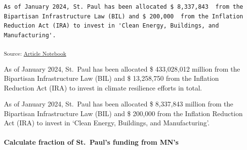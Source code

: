 \documentclass[
  letterpaper,
  DIV=11,
  numbers=noendperiod]{scrartcl}
\let\oldparagraph\paragraph
\renewcommand{\paragraph}[1]{\oldparagraph{#1}\mbox{}}
\begin{document}
\begin{verbatim}
As of January 2024, St. Paul has been allocated $ 8,337,843  from the Bipartisan Infrastructure Law (BIL) and $ 200,000  from the Inflation Reduction Act (IRA) to invest in 'Clean Energy, Buildings, and Manufacturing'.
\end{verbatim}

\textsubscript{Source:
\href{https://beeckcenter.github.io/climate-equity-workforce/index-preview.html}{Article
Notebook}}

As of January 2024, St.~Paul has been allocated \$ 433,028,012 million
from the Bipartisan Infrastructure Law (BIL) and \$ 13,258,750 from the
Inflation Reduction Act (IRA) to invest in climate resilience efforts in
total.

As of January 2024, St.~Paul has been allocated \$ 8,337,843 million
from the Bipartisan Infrastructure Law (BIL) and \$ 200,000 from the
Inflation Reduction Act (IRA) to invest in `Clean Energy, Buildings, and
Manufacturing'.

\paragraph{Calculate fraction of St.~Paul's funding from
MN's}\label{calculate-fraction-of-st.-pauls-funding-from-mns}
\end{document}
